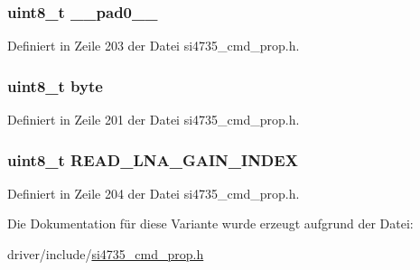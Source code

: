 \subsubsection[{\+\_\+\+\_\+pad0\+\_\+\+\_\+}]{\setlength{\rightskip}{0pt plus 5cm}uint8\+\_\+t \+\_\+\+\_\+pad0\+\_\+\+\_\+}\label{unionfm__agc__status__resp2_a8b4eebe79ded0459acec2f4950102ba3}


Definiert in Zeile 203 der Datei si4735\+\_\+cmd\+\_\+prop.\+h.

\hypertarget{unionfm__agc__status__resp2_a96f44d20f1dbf1c8785a7bc99a46164c}{}
\subsubsection[{byte}]{\setlength{\rightskip}{0pt plus 5cm}uint8\+\_\+t byte}\label{unionfm__agc__status__resp2_a96f44d20f1dbf1c8785a7bc99a46164c}


Definiert in Zeile 201 der Datei si4735\+\_\+cmd\+\_\+prop.\+h.

\hypertarget{unionfm__agc__status__resp2_a294c55f59e45473c7931802535ab68ed}{}
\subsubsection[{R\+E\+A\+D\+\_\+\+L\+N\+A\+\_\+\+G\+A\+I\+N\+\_\+\+I\+N\+D\+E\+X}]{\setlength{\rightskip}{0pt plus 5cm}uint8\+\_\+t R\+E\+A\+D\+\_\+\+L\+N\+A\+\_\+\+G\+A\+I\+N\+\_\+\+I\+N\+D\+E\+X}\label{unionfm__agc__status__resp2_a294c55f59e45473c7931802535ab68ed}


Definiert in Zeile 204 der Datei si4735\+\_\+cmd\+\_\+prop.\+h.



Die Dokumentation für diese Variante wurde erzeugt aufgrund der Datei\+:\begin{DoxyCompactItemize}
\item 
driver/include/\hyperlink{si4735__cmd__prop_8h}{si4735\+\_\+cmd\+\_\+prop.\+h}\end{DoxyCompactItemize}
